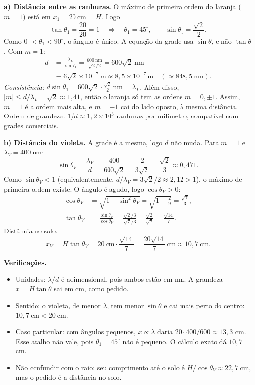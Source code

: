 \documentclass{article}%
\begin{document}
\textbf{a) Distância entre as ranhuras.}
O máximo de primeira ordem do laranja ($m = 1$) está em $x_1 = 20\ \text{cm} = H$. Logo
\[
\tan\theta_1 = \frac{20}{20} = 1 \quad\Rightarrow\quad \theta_1 = 45^\circ, \qquad \sin\theta_1 = \frac{\sqrt{2}}{2}.
\]
Como $0^\circ < \theta_1 < 90^\circ$, o ângulo é único. A equação da grade usa $\sin\theta$, e não $\tan\theta$. Com $m = 1$:
\begin{align*}
d &= \frac{\lambda_L}{\sin\theta_1} = \frac{600\ \text{nm}}{\sqrt{2}/2} = 600\sqrt{2}\ \text{nm} \\
  &= 6\sqrt{2}\times 10^{-7}\ \text{m} \approx 8{,}5\times 10^{-7}\ \text{m} \quad (\approx 848{,}5\ \text{nm}).
\end{align*}
\textit{Consistência:} $d\sin\theta_1 = 600\sqrt{2}\cdot\frac{\sqrt{2}}{2}\ \text{nm} = \lambda_L$. Além disso, $|m| \le d/\lambda_L = \sqrt{2} \approx 1{,}41$, então o laranja só tem as ordens $m = 0, \pm 1$. Assim, $m = 1$ é a ordem mais alta, e $m = -1$ cai do lado oposto, à mesma distância. Ordem de grandeza: $1/d \approx 1{,}2\times 10^{3}$ ranhuras por milímetro, compatível com grades comerciais.

\textbf{b) Distância do violeta.}
A grade é a mesma, logo $d$ não muda. Para $m = 1$ e $\lambda_V = 400\ \text{nm}$:
\[
\sin\theta_V = \frac{\lambda_V}{d} = \frac{400}{600\sqrt{2}} = \frac{2}{3\sqrt{2}} = \frac{\sqrt{2}}{3} \approx 0{,}471.
\]
Como $\sin\theta_V < 1$ (equivalentemente, $d/\lambda_V = 3\sqrt{2}/2 \approx 2{,}12 > 1$), o máximo de primeira ordem existe. O ângulo é agudo, logo $\cos\theta_V > 0$:
\begin{align*}
\cos\theta_V &= \sqrt{1-\sin^2\theta_V} = \sqrt{1-\frac{2}{9}} = \frac{\sqrt{7}}{3}, \\
\tan\theta_V &= \frac{\sin\theta_V}{\cos\theta_V} = \frac{\sqrt{2}/3}{\sqrt{7}/3} = \frac{\sqrt{2}}{\sqrt{7}} = \frac{\sqrt{14}}{7}.
\end{align*}
Distância no solo:
\[
x_V = H\tan\theta_V = 20\ \text{cm}\cdot\frac{\sqrt{14}}{7} = \frac{20\sqrt{14}}{7}\ \text{cm} \approx 10{,}7\ \text{cm}.
\]

\textbf{Verificações.}
\begin{itemize}
  \item Unidades: $\lambda/d$ é adimensional, pois ambos estão em nm. A grandeza $x = H\tan\theta$ sai em cm, como pedido.
  \item Sentido: o violeta, de menor $\lambda$, tem menor $\sin\theta$ e cai mais perto do centro: $10{,}7\ \text{cm} < 20\ \text{cm}$.
  \item Caso particular: com ângulos pequenos, $x \propto \lambda$ daria $20\cdot 400/600 \approx 13{,}3$ cm. Esse atalho não vale, pois $\theta_1 = 45^\circ$ não é pequeno. O cálculo exato dá $10{,}7$ cm.
  \item Não confundir com o raio: seu comprimento até o solo é $H/\cos\theta_V \approx 22{,}7\ \text{cm}$, mas o pedido é a distância no solo.
\end{itemize}
\end{document}
